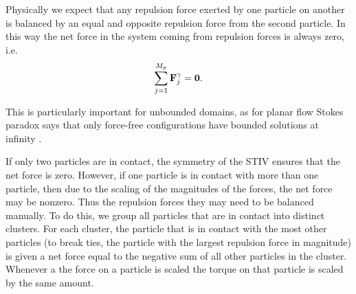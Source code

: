 \documentclass[preprint, 10pt]{elsarticle}
\begin{document}
Physically we expect that any repulsion force exerted by one particle on another is balanced by an equal and opposite repulsion force from the second particle. In this way the net force in the system coming from repulsion forces is always zero, i.e. 
\begin{equation*}
	\sum\limits_{j=1}^{M_p} {\mathbf{F}}^\gamma_j = \mathbf{0}.
\end{equation*}

This is particularly important for unbounded domains, as for planar flow Stokes paradox says that only force-free configurations have bounded solutions at infinity \cite{Power1993, Pozrikidis1992}. 

If only two particles are in contact, the symmetry of the STIV ensures that the net force is zero. However, if one particle is in contact with more than one particle, then due to the scaling of the magnitudes of the forces, the net force may be nonzero. Thus the repulsion forces they may need to be balanced manually. To do this, we group all particles that are in contact into distinct clusters. For each cluster, the particle that is in contact with the most other particles (to break ties, the particle with the largest repulsion force in magnitude) is given a net force equal to the negative sum of all other particles in the cluster. Whenever a the force on a particle is scaled the torque on that particle is scaled by the same amount. 
\end{document}
